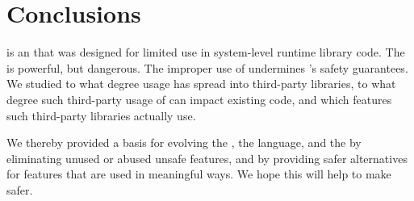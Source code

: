 \section{Conclusions}\label{sec:unsafe:conclusions}

\smu{} is an \api{} that was designed for limited use in system-level runtime library code.
The \unsafe{} \api{} is powerful, but dangerous.
The improper use of \unsafe{} undermines \java{}'s safety guarantees.
We studied to what degree \unsafe{} usage has spread into third-party libraries,
to what degree such third-party usage of \unsafe{} can impact existing \java{} code,
and which \unsafe{} \api{} features such third-party libraries actually use.

We thereby provided a basis for evolving the \unsafe{} \api{}, the \java{} language,
and the \jvm{} by eliminating unused or abused unsafe features,
and by providing safer alternatives for features that are used in meaningful ways.
We hope this will help to make \unsafe{} safer.

